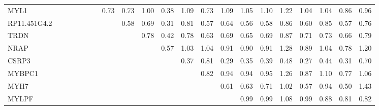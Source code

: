 \begin{longtable}{lrrrrrrrrrrrrrrrrrrrr}
MYL1         &             &             &             &             &               &            &               0.73 &       0.73 &       1.00 &        0.38 &         1.09 &       0.73 &        1.09 &       1.05 &       1.10 &      1.22 &         1.04 &        1.04 &        0.86 &     0.96 \\
RP11.451G4.2 &             &             &             &             &               &            &                    &       0.58 &       0.69 &        0.31 &         0.81 &       0.57 &        0.64 &       0.56 &       0.58 &      0.86 &         0.60 &        0.85 &        0.57 &     0.76 \\
TRDN         &             &             &             &             &               &            &                    &            &       0.78 &        0.42 &         0.78 &       0.63 &        0.69 &       0.65 &       0.69 &      0.87 &         0.71 &        0.73 &        0.66 &     0.79 \\
NRAP         &             &             &             &             &               &            &                    &            &            &        0.57 &         1.03 &       1.04 &        0.91 &       0.90 &       0.91 &      1.28 &         0.89 &        1.04 &        0.78 &     1.20 \\
CSRP3        &             &             &             &             &               &            &                    &            &            &             &         0.37 &       0.81 &        0.29 &       0.35 &       0.39 &      0.48 &         0.27 &        0.44 &        0.31 &     0.70 \\
MYBPC1       &             &             &             &             &               &            &                    &            &            &             &              &       0.82 &        0.94 &       0.94 &       0.95 &      1.26 &         0.87 &        1.10 &        0.77 &     1.06 \\
MYH7         &             &             &             &             &               &            &                    &            &            &             &              &            &        0.61 &       0.63 &       0.71 &      1.02 &         0.57 &        0.94 &        0.50 &     1.43 \\
MYLPF        &             &             &             &             &               &            &                    &            &            &             &              &            &             &       0.99 &       0.99 &      1.08 &         0.99 &        0.88 &        0.81 &     0.82 \\

\end{longtable}
